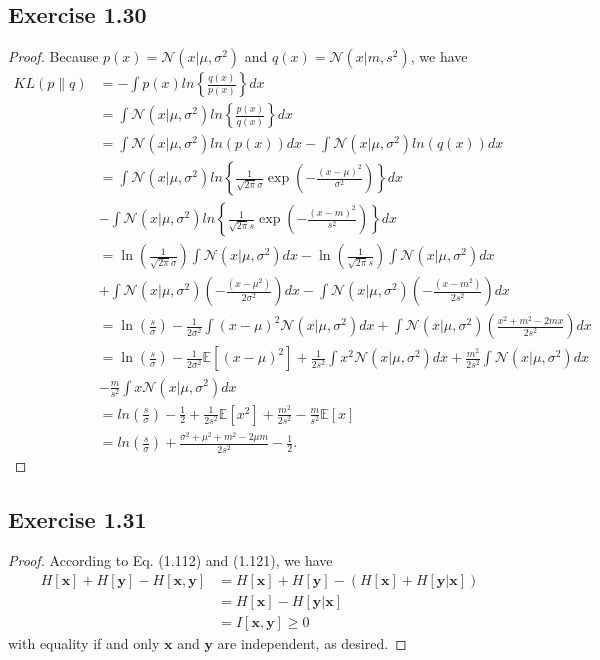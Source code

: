 \documentclass[11pt]{article}
\theoremstyle{definition}
\newcommand{\E}{\mathbb{E}}
\begin{document}
\subsection{Exercise 1.30}
\begin{proof}
Because $p(x) = \mathcal{N}(x|\mu,\sigma^2)$ and $q(x) = \mathcal{N}(x|m,s^2)$, we have
\begin{align*}
KL(p\lVert q) &= -\int p(x)ln\left\{\frac{q(x)}{p(x)}\right\}dx \\
&= \int \mathcal{N}(x|\mu,\sigma^2)ln\left\{\frac{p(x)}{q(x)}\right\}dx \\
&= \int \mathcal{N}(x|\mu,\sigma^2)ln(p(x))dx - \int \mathcal{N}(x|\mu,\sigma^2)ln(q(x))dx \\
&= \int \mathcal{N}(x|\mu,\sigma^2)ln\left\{\frac{1}{\sqrt{2\pi}\sigma}\exp\left(-\frac{(x-\mu)^2}{\sigma^2}\right)\right\}dx \\
& - \int \mathcal{N}(x|\mu,\sigma^2)ln\left\{\frac{1}{\sqrt{2\pi}s}\exp\left(-\frac{(x-m)^2}{s^2}\right)\right\}dx\\
&= \ln\left(\frac{1}{\sqrt{2\pi}\sigma}\right)\int \mathcal{N}(x|\mu,\sigma^2)dx - \ln\left(\frac{1}{\sqrt{2\pi}s}\right)\int \mathcal{N}(x|\mu,\sigma^2)dx \\
&+ \int \mathcal{N}(x|\mu,\sigma^2)\left(-\frac{(x-\mu^2)}{2\sigma^2}\right)dx - \int \mathcal{N}(x|\mu,\sigma^2)\left(-\frac{(x-m^2)}{2s^2}\right)dx \\
&= \ln\left(\frac{s}{\sigma}\right) - \frac{1}{2\sigma^2}\int(x-\mu)^2\mathcal{N}(x|\mu,\sigma^2)dx + \int \mathcal{N}(x|\mu,\sigma^2)\left(\frac{x^2 + m^2 - 2mx}{2s^2}\right)dx \\
&= \ln\left(\frac{s}{\sigma}\right) - \frac{1}{2\sigma^2}\E[(x-\mu)^2] + \frac{1}{2s^2}\int x^2\mathcal{N}(x|\mu,\sigma^2)dx + \frac{m^2}{2s^2}\int\mathcal{N}(x|\mu,\sigma^2)dx\\
&- \frac{m}{s^2}\int x\mathcal{N}(x|\mu,\sigma^2)dx \\
&= ln\left(\frac{s}{\sigma}\right) - \frac{1}{2} + \frac{1}{2s^2}\E[x^2] + \frac{m^2}{2s^2} - \frac{m}{s^2}\E[x] \\
&= ln\left(\frac{s}{\sigma}\right) + \frac{\sigma^2+\mu^2+m^2-2\mu m}{2s^2} -\frac{1}{2}.
\end{align*}
\end{proof}

\subsection{Exercise 1.31}
\begin{proof}
According to Eq. (1.112) and (1.121), we have
\begin{align*}
H[\textbf{x}] + H[\textbf{y}] - H[\textbf{x}, \textbf{y}] &= H[\textbf{x}] + H[\textbf{y}] - (H[\textbf{x}] + H[\textbf{y}|\textbf{x}]) \\
 &= H[\textbf{x}] - H[\textbf{y}|\textbf{x}] \\
 &= I[\textbf{x}, \textbf{y}] \geq 0
\end{align*}
with equality if and only $\textbf{x}$ and $\textbf{y}$ are independent, as desired. 
\end{proof}
\end{document}
